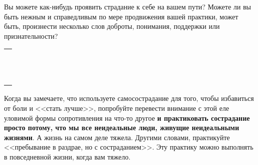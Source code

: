 \begin{itemize}
	\itemWritingHand Вы можете как-нибудь проявить страдание к себе на вашем пути? Можете ли вы быть нежным и справедливым по мере продвижения вашей практики, может быть, произнести несколько слов доброты, понимания, поддержки или признательности?
\end{itemize}
\setlength{\extrarowheight}{2mm}
\begin{tabularx}{\textwidth}{X}
	\\
	\arrayrulecolor{gray}\hline\\
	\hline\\
	\hline\\
	\hline\\
	\hline\\
	\hline\\	
	\hline\\
	\hline\\
	\hline\\
	\hline\\
	\hline\\
	\hline\\
	\hline\\
\end{tabularx}
\setlength{\extrarowheight}{0mm}


\newpage
{} \label{Being_a_Compassionate_Mess}

Когда вы замечаете, что используете самосострадание для того, чтобы избавиться от боли и <<стать лучше>>, попробуйте перевести внимание с этой еле уловимой формы сопротивления на что-то другое \textbf{и практиковать сострадание просто потому, что мы все неидеальные люди, живущие неидеальными жизнями}. А жизнь на самом деле тяжела. Другими словами, практикуйте <<пребывание в раздрае, но с состраданием>>. Эту практику можно выполнять в повседневной жизни, когда вам тяжело. 

